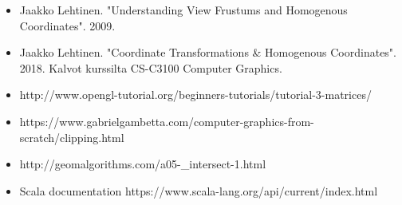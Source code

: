 \documentclass[12pt] {article}
\begin{document}
\begin{itemize}
	\item Jaakko Lehtinen. "Understanding View Frustums and Homogenous Coordinates". 2009.
	\item Jaakko Lehtinen. "Coordinate Transformations \& Homogenous Coordinates". 2018. Kalvot kurssilta CS-C3100 Computer Graphics.
	\item http://www.opengl-tutorial.org/beginners-tutorials/tutorial-3-matrices/
	\item https://www.gabrielgambetta.com/computer-graphics-from-scratch/clipping.html
	\item http://geomalgorithms.com/a05-\_intersect-1.html
	\item Scala documentation https://www.scala-lang.org/api/current/index.html
\end{itemize}
\end{document}
